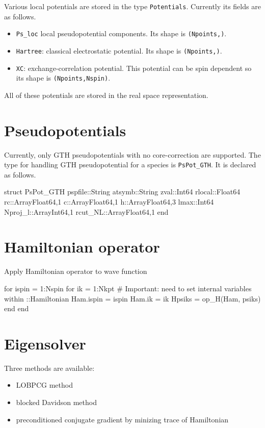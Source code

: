 \documentclass[a4paper,10pt,twocolumn]{paper}
\newcommand{\jlcode}[1]{\texttt{#1}}
\begin{document}
Various local potentials are stored in the type \jlcode{Potentials}. Currently
its fields are as follows.
\begin{itemize}
%
\item \jlcode{Ps_loc} local pseudopotential components.
  Its shape is \jlcode{(Npoints,)}.
%
\item \jlcode{Hartree}: classical electrostatic potential.
  Its shape is \jlcode{(Npoints,)}.
%
\item \jlcode{XC}: exchange-correlation potential. This potential can be spin
  dependent so its shape is \jlcode{(Npoints,Nspin)}.
%
\end{itemize}

All of these potentials are stored in the real space representation.


\section{Pseudopotentials}

Currently, only GTH pseudopotentials with no core-correction are supported.
The type for handling GTH pseudopotential for a species is \jlcode{PsPot_GTH}.
It is declared as follows.

\begin{juliacode}
struct PsPot_GTH
    pspfile::String
    atsymb::String
    zval::Int64
    rlocal::Float64
    rc::Array{Float64,1}
    c::Array{Float64,1}
    h::Array{Float64,3}
    lmax::Int64
    Nproj_l::Array{Int64,1}
    rcut_NL::Array{Float64,1}
end
\end{juliacode}

\section{Hamiltonian operator}

Apply Hamiltonian operator to wave function
\begin{juliacode}
for ispin = 1:Nspin
    for ik = 1:Nkpt
        # Important: need to set internal variables within ::Hamiltonian
        Ham.ispin = ispin
        Ham.ik = ik
        Hpsiks = op_H(Ham, psiks)
    end
end
\end{juliacode}


\section{Eigensolver}

Three methods are available:
\begin{itemize}
\item LOBPCG method
\item blocked Davidson method
\item preconditioned conjugate gradient by minizing trace of Hamiltonian
\end{itemize}
\end{document}
